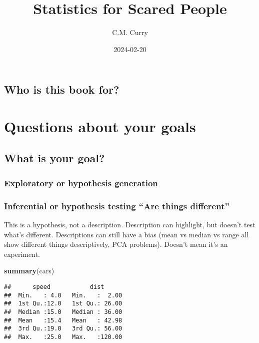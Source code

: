 \documentclass[
]{book}
\title{Statistics for Scared People}
\author{C.M. Curry}
\date{2024-02-20}
\newenvironment{Shaded}{\begin{snugshade}}{\end{snugshade}}
\newcommand{\FunctionTok}[1]{\textcolor[rgb]{0.13,0.29,0.53}{\textbf{#1}}}
\newcommand{\NormalTok}[1]{#1}
\begin{document}
\maketitle

{
\setcounter{tocdepth}{1}
\tableofcontents
}
\hypertarget{who-is-this-book-for}{%
\chapter*{Who is this book for?}\label{who-is-this-book-for}}

\hypertarget{part-questions-about-your-goals}{%
\part{Questions about your goals}\label{part-questions-about-your-goals}}

\hypertarget{what-is-your-goal}{%
\chapter{What is your goal?}\label{what-is-your-goal}}

\hypertarget{exploratory-or-hypothesis-generation}{%
\section{Exploratory or hypothesis generation}\label{exploratory-or-hypothesis-generation}}

\hypertarget{inferential-or-hypothesis-testing-are-things-different}{%
\section{Inferential or hypothesis testing ``Are things different''}\label{inferential-or-hypothesis-testing-are-things-different}}

This is a hypothesis, not a description. Description can highlight, but doesn't test what's different. Descriptions can still have a bias (mean vs median vs range all show different things descriptively, PCA problems). Doesn't mean it's an experiment.

\begin{Shaded}
\begin{Highlighting}[]
\FunctionTok{summary}\NormalTok{(cars)}
\end{Highlighting}
\end{Shaded}

\begin{verbatim}
##      speed           dist       
##  Min.   : 4.0   Min.   :  2.00  
##  1st Qu.:12.0   1st Qu.: 26.00  
##  Median :15.0   Median : 36.00  
##  Mean   :15.4   Mean   : 42.98  
##  3rd Qu.:19.0   3rd Qu.: 56.00  
##  Max.   :25.0   Max.   :120.00
\end{verbatim}
\end{document}
